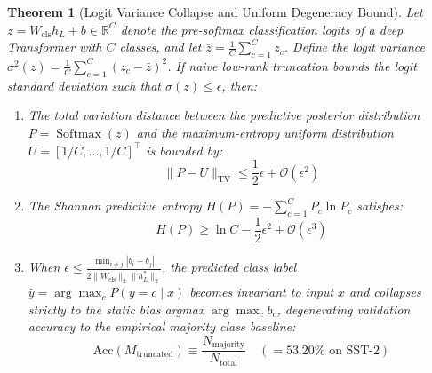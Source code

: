 \documentclass{article}
\newtheorem{theorem}{Theorem}
\begin{document}
\begin{theorem}[Logit Variance Collapse and Uniform Degeneracy Bound]
\label{thm:logit_variance_collapse}
Let $z = W_{\text{cls}} h_L + b \in \mathbb{R}^C$ denote the pre-softmax classification logits of a deep Transformer with $C$ classes, and let $\bar{z} = \frac{1}{C}\sum_{c=1}^C z_c$. Define the logit variance $\sigma^2(z) = \frac{1}{C}\sum_{c=1}^C (z_c - \bar{z})^2$. If naive low-rank truncation bounds the logit standard deviation such that $\sigma(z) \le \epsilon$, then:
\begin{enumerate}
    \item The total variation distance between the predictive posterior distribution $P = \operatorname{Softmax}(z)$ and the maximum-entropy uniform distribution $U = [1/C, \dots, 1/C]^\top$ is bounded by:
    \begin{equation}
        \|P - U\|_{\text{TV}} \le \frac{1}{2} \epsilon + \mathcal{O}(\epsilon^2)
    \end{equation}
    \item The Shannon predictive entropy $H(P) = -\sum_{c=1}^C P_c \ln P_c$ satisfies:
    \begin{equation}
        H(P) \ge \ln C - \frac{1}{2} \epsilon^2 + \mathcal{O}(\epsilon^3)
    \end{equation}
    \item When $\epsilon \le \frac{\min_{i \ne j} |b_i - b_j|}{2 \|W_{\text{cls}}\|_2 \|h_L^*\|_2}$, the predicted class label $\hat{y} = \arg\max_c P(y=c \mid x)$ becomes invariant to input $x$ and collapses strictly to the static bias argmax $\arg\max_c b_c$, degenerating validation accuracy to the empirical majority class baseline:
    \begin{equation}
        \text{Acc}(M_{\text{truncated}}) \equiv \frac{N_{\text{majority}}}{N_{\text{total}}} \quad (= 53.20\% \text{ on SST-2})
    \end{equation}
\end{enumerate}
\end{theorem}
\end{document}
